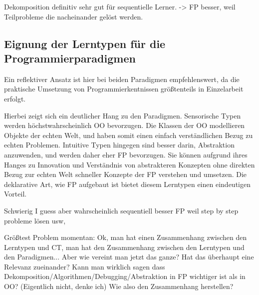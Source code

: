 Dekomposition definitiv sehr gut für sequentielle Lerner. -> FP besser, weil Teilprobleme die nacheinander gelöst werden.

\subsection{Eignung der Lerntypen für die Programmierparadigmen}

Ein reflektiver Ansatz ist hier bei beiden Paradigmen empfehlenswert, da die praktische Umsetzung von Programmierkentnissen größtenteils in Einzelarbeit erfolgt.

Hierbei zeigt sich ein deutlicher Hang zu den Paradigmen. Sensorische Typen werden höchstwahrscheinlich OO bevorzugen. Die Klassen der OO modellieren Objekte der echten Welt, und haben somit einen einfach verständlichen Bezug zu echten Problemen.
Intuitive Typen hingegen sind besser darin, Abstraktion anzuwenden, und werden daher eher FP bevorzugen. Sie können aufgrund ihres Hanges zu Innovation und Verständnis von abstrakteren Konzepten ohne direkten Bezug zur echten Welt schneller Konzepte der FP verstehen und umsetzen. Die deklarative Art, wie FP aufgebaut ist bietet diesem Lerntypen einen eindeutigen Vorteil.

Schwierig I guess aber wahrscheinlich sequentiell besser FP weil step by step probleme lösen usw,

Größtest Problem momentan: Ok, man hat einen Zusammenhang zwischen den Lerntypen und CT, man hat den Zusammenhang zwischen den Lerntypen und den Paradigmen... Aber wie vereint man jetzt das ganze? Hat das überhaupt eine Relevanz zueinander? Kann man wirklich sagen dass Dekomposition/Algorithmen/Debugging/Abstraktion in FP wichtiger ist als in OO? (Eigentlich nicht, denke ich)
Wie also den Zusammenhang herstellen?


